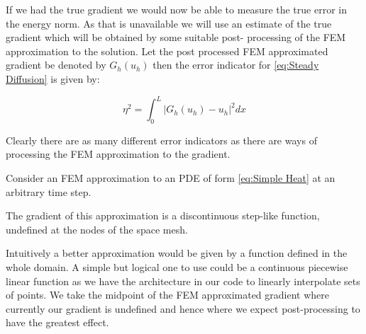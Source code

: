 \documentclass{uonmathreport}
\theoremstyle{definition}
\theoremstyle{problem}
\theoremstyle{theorem}
\begin{document}
If we had the true gradient we would now be able to measure the true error in the energy norm. As that is unavailable we will use an estimate of the true gradient which will be obtained by some suitable post- processing of the FEM approximation to the solution. Let the post processed FEM approximated gradient be denoted by $G_h(u_h)$ then the error indicator for \ref{eq:Steady Diffusion} is given by:

\begin{equation}
\eta^2 = \int_0^L  |G_h(u_h) - u_h|^2  dx
\end{equation}

Clearly there are as many different error indicators as there are ways of processing the FEM approximation to the gradient.

Consider an FEM approximation to an PDE of form \ref{eq:Simple Heat} at an arbitrary time step.

\begin{center}
\end{center}

The gradient of this approximation is a discontinuous step-like function, undefined at the nodes of the space mesh.

\begin{center}
\end{center}

Intuitively a better approximation would be given by a function defined in the whole domain. A simple but logical one to use could be a continuous piecewise linear function as we have the architecture in our code to linearly interpolate sets of points. We take the midpoint of the FEM approximated gradient where currently our gradient is undefined and hence where we expect post-processing to have the greatest effect. 
\end{document}
